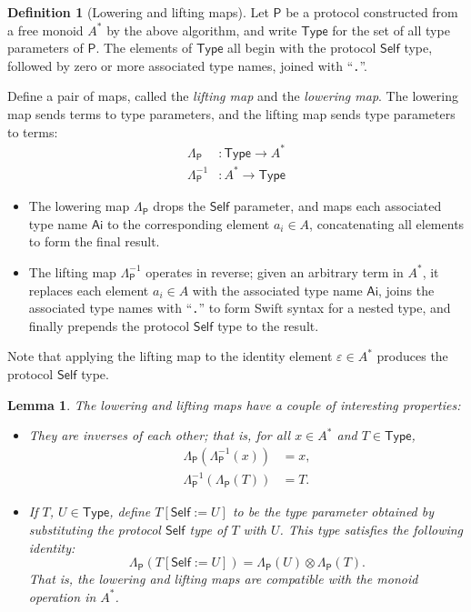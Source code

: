 \documentclass[headsepline,bibliography=totoc]{scrreport}
\newcommand{\namesym}[1]{\mathsf{#1}}
\newcommand{\genericparam}[1]{\bm{\mathsf{#1}}}
\newcommand{\proto}[1]{\bm{\mathsf{#1}}}
\newtheorem{lemma}{Lemma}[chapter]
\theoremstyle{definition}
\theoremstyle{definition}
\newtheorem{definition}{Definition}[chapter]
\theoremstyle{definition}
\begin{document}
\begin{definition}[Lowering and lifting maps]\label{liftingloweringmaps}
Let $\proto{P}$ be a protocol constructed from a free monoid $A^*$ by the above algorithm, and write $\mathsf{Type}$ for the set of all type parameters of $\proto{P}$. The elements of $\mathsf{Type}$ all begin with the protocol $\genericparam{Self}$ type, followed by zero or more associated type names, joined with ``\texttt{.}''.

Define a pair of maps, called the \emph{lifting map} and the \emph{lowering map}. The lowering map sends terms to type parameters, and the lifting map sends type parameters to terms:
\begin{align*}
\Lambda_{\proto{P}}&\colon \mathsf{Type}\rightarrow A^*\\
\Lambda^{-1}_{\proto{P}}&\colon A^*\rightarrow\mathsf{Type}
\end{align*}
\index{protocol $\genericparam{Self}$ type}
\begin{itemize}
\item The lowering map $\Lambda_{\proto{P}}$ drops the $\genericparam{Self}$ parameter, and maps each associated type name $\namesym{Ai}$ to the corresponding element $a_i\in A$, concatenating all elements to form the final result.
\item The lifting map $\Lambda^{-1}_{\proto{P}}$ operates in reverse; given an arbitrary term in $A^*$, it replaces each element $a_i\in A$ with the associated type name $\namesym{Ai}$, joins the associated type names with ``\texttt{.}'' to form Swift syntax for a nested type, and finally prepends the protocol $\genericparam{Self}$ type to the result.
\end{itemize}
Note that applying the lifting map to the identity element $\varepsilon\in A^*$ produces the protocol $\genericparam{Self}$ type.
\end{definition}
\begin{lemma}
The lowering and lifting maps have a couple of interesting properties:
\begin{itemize}
\item They are inverses of each other; that is, for all $x\in A^*$ and $T\in\mathsf{Type}$,
\begin{align*}
\Lambda_{\proto{P}}(\Lambda_{\proto{P}}^{-1}(x))&=x,\\
\Lambda_{\proto{P}}^{-1}(\Lambda_{\proto{P}}(T))&=T.
\end{align*}
\item If $T$, $U\in\mathsf{Type}$, define $T[\genericparam{Self}:=U]$ to be the type parameter obtained by substituting the protocol $\genericparam{Self}$ type of $T$ with $U$. This type satisfies the following identity:
\[\Lambda_{\proto{P}}(T[\genericparam{Self}:=U]) = \Lambda_{\proto{P}}(U)\otimes \Lambda_{\proto{P}}(T).\]
That is, the lowering and lifting maps are compatible with the monoid operation in $A^*$.
\end{itemize}
\end{lemma}
\end{document}
